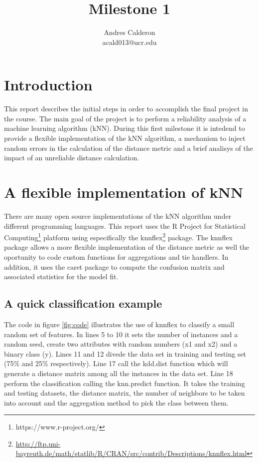 \documentclass{article}\usepackage[]{graphicx}\usepackage[]{color}
\title{Milestone 1}
\author{Andres Calderon \\ acald013@ucr.edu}
\begin{document}
\maketitle

\section{Introduction}
This report describes the initial steps in order to accomplish the final project in the course. The main goal of the project is to perform a reliability analysis of a machine learning algorithm (kNN).  During this first milestone it is intedend to provide a flexible implementation of the kNN algorithm, a mechanism to inject random errors in the calculation of the distance metric and a brief analisys of the impact of an unreliable distance calculation.

\section{A flexible implementation of kNN}
There are many open source implementations of the kNN algorithm under different programming languages.  This report uses the R Project for Statistical Computing\footnote{https://www.r-project.org/} platform using especifically the knnflex\footnote{\url{http://ftp.uni-bayreuth.de/math/statlib/R/CRAN/src/contrib/Descriptions/knnflex.html}} package. The knnflex package allows a more flexible implementation of the distance metric as well the oportunity to code custom functions for aggregations and tie handlers.  In addition, it uses the caret package to compute the confusion matrix and associated statistics for the model fit.

\subsection{A quick classification example}
The code in figure \ref{fig:code} illustrates the use of knnflex to classify a small random set of features.  In lines 5 to 10 it sets the number of instances and a random seed, create two attributes with random numbers (x1 and x2) and a binary class (y).  Lines 11 and 12 divede the data set in training and testing set (75\% and 25\% respectively). Line 17 call the kdd.dist function which will generate a distance matrix among all the instances in the data set. Line 18 perform the classification calling the knn.predict function.  It takes the training and testing datasets, the distance matrix, the number of neighbors to be taken into account and the aggregation method to pick the class between them.  
\end{document}
